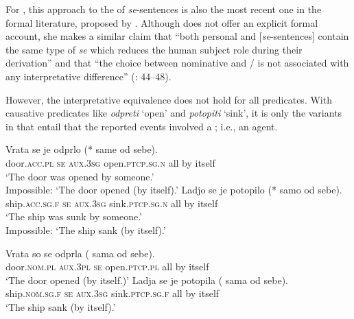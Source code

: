 \documentclass[output=paper,nonflat,newtxmath]{langsci/langscibook}
\begin{document}
For , this approach to the  of \textit{se}-sentences is also the most recent one in the formal literature, proposed by \citet{grahek2008}. Although \citeauthor{grahek2008} does not offer an explicit formal account, she makes a similar claim that “both personal and  [\textit{se}-sentences] contain the same type of \textit{se} which reduces the human subject role during their derivation'' and that “the choice between nominative and / is not associated with any interpretative difference'' (\citealt{grahek2008}: 44--48).

However, the interpretative equivalence does not hold for all predicates. With causative predicates like \textit{odpreti} `open' and \textit{potopiti} `sink', it is only the  variants in  that entail that the reported events involved a ; i.e., an agent.

\begin{exe}
\ex \label{ex:lenardic: 4}
\begin{xlist}
\ex \gll Vrata se je odprlo (*\hspace{-2pt} same od sebe).\\
door.\textsc{acc.pl} \textsc{se} \textsc{aux}.\textsc{3sg} open.\textsc{ptcp.sg.n} {} all by itself\\
\trans `The door was opened by someone.'\\ Impossible: `The door opened (by itself).'
\ex \label{ex:lenardic: 4b} \gll Ladjo se je potopilo (*\hspace{-2pt} samo od sebe).\\
ship.\textsc{acc.sg.f} \textsc{se} \textsc{aux}.\textsc{3sg} sink.\textsc{ptcp.sg.n} {} all by itself\\
\trans `The ship was sunk by someone.'\\ Impossible: `The ship sank (by itself).'
\end{xlist}
\ex \label{ex:lenardic: 5} \begin{xlist}
\ex \gll Vrata so se odprla (\hspace{-2pt} sama od sebe).\\
door.\textsc{nom.pl} \textsc{aux}.\textsc{3pl} \textsc{se} open.\textsc{ptcp.pl} {} all by itself\\
\trans `The door opened (by itself.)'
\ex \gll Ladja se je potopila (\hspace{-2pt} sama od sebe).\\
ship.\textsc{nom.sg.f} \textsc{se} \textsc{aux}.\textsc{3sg} sink.\textsc{ptcp.sg.f} {} all by itself\\
\trans `The ship sank (by itself).'
\end{xlist}
\end{exe}
\end{document}
